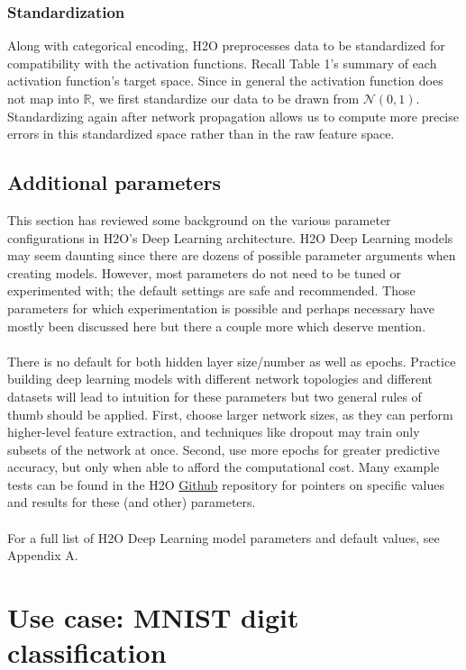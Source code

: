 \documentclass[12pt]{article}
\begin{document}
\subsubsection{Standardization}

Along with categorical encoding, H2O preprocesses data to be standardized for compatibility with the activation functions. Recall Table 1's summary of each activation function's target space. Since in general the activation function does not map into $\mathbb{R}$, we first standardize our data to be drawn from $\mathcal{N}(0,1)$. Standardizing again after network propagation allows us to compute more precise errors in this standardized space rather than in the raw feature space. 

\subsection{Additional parameters}

This section has reviewed some background on the various parameter configurations in H2O's Deep Learning architecture. H2O Deep Learning models may seem daunting since there are dozens of possible parameter arguments when creating models. However, most parameters do not need to be tuned or experimented with; the default settings are safe and recommended. Those parameters for which experimentation is possible and perhaps necessary have mostly been discussed here but there a couple more which deserve mention.
\\
\\
There is no default for both hidden layer size/number as well as epochs. Practice building deep learning models with different network topologies and different datasets will lead to intuition for these parameters but two general rules of thumb should be applied. First, choose larger network sizes, as they can perform higher-level feature extraction, and techniques like dropout may train only subsets of the network at once. Second, use more epochs for greater predictive accuracy, but only when able to afford the computational cost. Many example tests can be found in the H2O \href{https://github.com/0xdata/h2o/}{Github} repository for pointers on specific values and results for these (and other) parameters.
\\
\\
For a full list of H2O Deep Learning model parameters and default values, see Appendix A. 

\section{Use case: MNIST digit classification}
\end{document}
